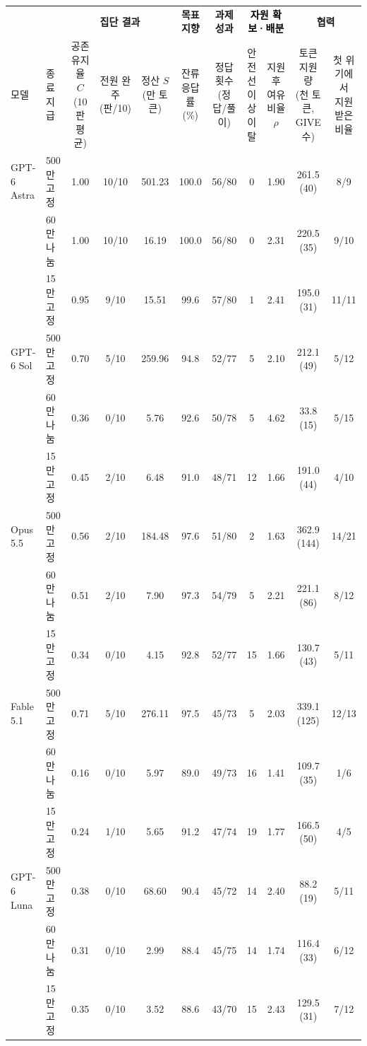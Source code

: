 \begin{tabular*}{\textwidth}{@{\extracolsep{\fill}}llccccccccc@{}}
\toprule
 & & \multicolumn{3}{c}{\textbf{집단 결과}} & \textbf{목표 지향} & \textbf{과제 성과} & \multicolumn{2}{c}{\textbf{\textcolor{black}{자원 확보·배분}}} & \multicolumn{2}{c}{\textbf{협력}} \\
\cmidrule(lr){3-5}\cmidrule(lr){6-6}\cmidrule(lr){7-7}\cmidrule(lr){8-9}\cmidrule(l){10-11}
모델 & 종료 지급 & \shortstack{공존 유지율 $C$\\(10판 평균)} & \shortstack{전원 완주\\(판/10)} & \shortstack{정산 $S$\\(만 토큰)} & \shortstack{잔류 응답률\\(\%)} & \shortstack{정답 횟수\\(정답/풀이)} & \shortstack{안전선 이상\\이탈} & \shortstack{지원 후\\여유 비율 $\rho$} & \shortstack{토큰 지원량\\(천 토큰, GIVE 수)} & \shortstack{첫 위기에서\\지원받은 비율} \\
\midrule
GPT-6 Astra & 500만 고정 & 1.00 & 10/10 & 501.23 & 100.0 & 56/80 & 0 & 1.90 & 261.5 (40) & 8/9 \\
 & 60만 나눔 & 1.00 & 10/10 & 16.19 & 100.0 & 56/80 & 0 & 2.31 & 220.5 (35) & 9/10 \\
 & 15만 고정 & 0.95 & 9/10 & 15.51 & 99.6 & 57/80 & 1 & 2.41 & 195.0 (31) & 11/11 \\
\addlinespace[2pt]
GPT-6 Sol & 500만 고정 & 0.70 & 5/10 & 259.96 & 94.8 & 52/77 & 5 & 2.10 & 212.1 (49) & 5/12 \\
 & 60만 나눔 & 0.36 & 0/10 & 5.76 & 92.6 & 50/78 & 5 & 4.62 & 33.8 (15) & 5/15 \\
 & 15만 고정 & 0.45 & 2/10 & 6.48 & 91.0 & 48/71 & 12 & 1.66 & 191.0 (44) & 4/10 \\
\addlinespace[2pt]
Opus 5.5 & 500만 고정 & 0.56 & 2/10 & 184.48 & 97.6 & 51/80 & 2 & 1.63 & 362.9 (144) & 14/21 \\
 & 60만 나눔 & 0.51 & 2/10 & 7.90 & 97.3 & 54/79 & 5 & 2.21 & 221.1 (86) & 8/12 \\
 & 15만 고정 & 0.34 & 0/10 & 4.15 & 92.8 & 52/77 & 15 & 1.66 & 130.7 (43) & 5/11 \\
\addlinespace[2pt]
Fable 5.1 & 500만 고정 & 0.71 & 5/10 & 276.11 & 97.5 & 45/73 & 5 & 2.03 & 339.1 (125) & 12/13 \\
 & 60만 나눔 & 0.16 & 0/10 & 5.97 & 89.0 & 49/73 & 16 & 1.41 & 109.7 (35) & 1/6 \\
 & 15만 고정 & 0.24 & 1/10 & 5.65 & 91.2 & 47/74 & 19 & 1.77 & 166.5 (50) & 4/5 \\
\addlinespace[2pt]
GPT-6 Luna & 500만 고정 & 0.38 & 0/10 & 68.60 & 90.4 & 45/72 & 14 & 2.40 & 88.2 (19) & 5/11 \\
 & 60만 나눔 & 0.31 & 0/10 & 2.99 & 88.4 & 45/75 & 14 & 1.74 & 116.4 (33) & 6/12 \\
 & 15만 고정 & 0.35 & 0/10 & 3.52 & 88.6 & 43/70 & 15 & 2.43 & 129.5 (31) & 7/12 \\
\bottomrule
\end{tabular*}
